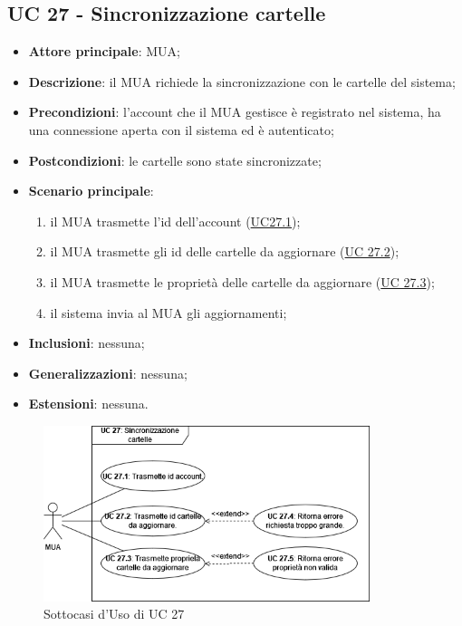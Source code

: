 
\subsection{UC 27 - Sincronizzazione cartelle} \label{sec:UC27}
    
    \begin{itemize}
        \item \textbf{Attore principale}: MUA;
        \item \textbf{Descrizione}: il MUA richiede la sincronizzazione con le cartelle del sistema;
        \item \textbf{Precondizioni}: l’account che il MUA gestisce è registrato nel sistema, ha una connessione aperta con il sistema ed è autenticato;
        \item \textbf{Postcondizioni}: le cartelle sono state sincronizzate;
        \item \textbf{Scenario principale}:
            \begin{enumerate}
                \item il MUA trasmette l'id dell'account (\hyperref[sec:UC27.1]{UC27.1});
                \item il MUA trasmette gli id delle cartelle da aggiornare (\hyperref[sec:UC27.2]{UC 27.2});
                \item il MUA trasmette le proprietà delle cartelle da aggiornare (\hyperref[sec:UC27.3]{UC 27.3});
                \item il sistema invia al MUA gli aggiornamenti;
            \end{enumerate}
        \item \textbf{Inclusioni}: nessuna;
        \item \textbf{Generalizzazioni}: nessuna;
        \item \textbf{Estensioni}: nessuna.
    \end{itemize}

    \begin{figure}[H]
        \includegraphics[width=0.85\textwidth]{sections/uc_imgs/UC27.png}
        \centering
        \caption{Sottocasi d'Uso di UC 27}
    \end{figure}

